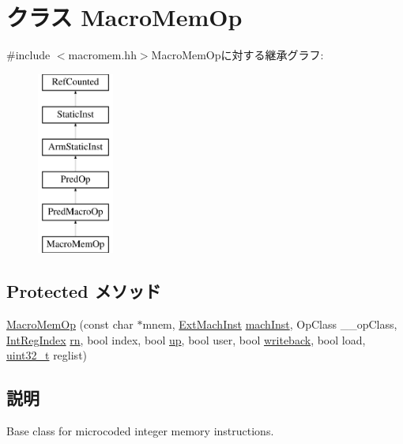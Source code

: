 \hypertarget{classArmISA_1_1MacroMemOp}{
\section{クラス MacroMemOp}
\label{classArmISA_1_1MacroMemOp}
}


{\ttfamily \#include $<$macromem.hh$>$}MacroMemOpに対する継承グラフ:\begin{figure}[H]
\begin{center}
\leavevmode
\includegraphics[height=6cm]{classArmISA_1_1MacroMemOp}
\end{center}
\end{figure}
\subsection*{Protected メソッド}
\begin{DoxyCompactItemize}
\item 
\hyperlink{classArmISA_1_1MacroMemOp_a008eeb85abf61c91301851bc54b7a726}{MacroMemOp} (const char $\ast$mnem, \hyperlink{classStaticInst_a5605d4fc727eae9e595325c90c0ec108}{ExtMachInst} \hyperlink{classStaticInst_a744598b194ca3d4201d9414ce4cc4af4}{machInst}, OpClass \_\-\_\-opClass, \hyperlink{namespaceArmISA_ae64680ba9fb526106829d6bf92fc791b}{IntRegIndex} \hyperlink{namespaceArmISA_adf8c6c579ad8729095a637a4f2181211}{rn}, bool index, bool \hyperlink{namespaceArmISA_a3a82fdc0669ddcc0c196b1ac0220c55a}{up}, bool user, bool \hyperlink{namespaceArmISA_a8143fa40e9030da2e8b93ba9990a7bb1}{writeback}, bool load, \hyperlink{Type_8hh_a435d1572bf3f880d55459d9805097f62}{uint32\_\-t} reglist)
\end{DoxyCompactItemize}


\subsection{説明}
Base class for microcoded integer memory instructions. 

